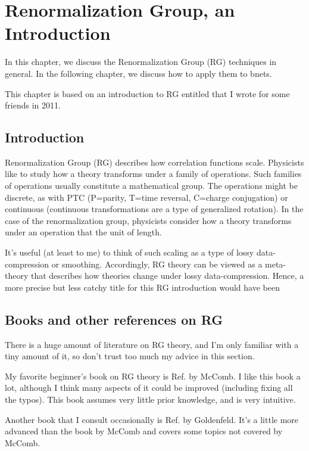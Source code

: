\chapter{Renormalization Group, an Introduction}
\label{ch-renorm-group1}

In this chapter, we discuss
the Renormalization Group (RG)
techniques in general.
In the following chapter,
we discuss how to
apply them to bnets.

This chapter is based on 
an introduction to RG 
entitled  that I wrote for some friends in 2011.

\section{Introduction}
 Renormalization Group (RG)
 describes how
correlation functions
scale.
Physicists
like to study how a
theory transforms under a family of operations.
Such families of operations
usually constitute a mathematical group.
The operations might be discrete, as with
PTC (P=parity, T=time reversal, C=charge conjugation)
or continuous (continuous transformations
are a type of generalized rotation). In
the case of the renormalization
group, physicists consider
how a theory transforms under
an operation that 
 the unit of length.

It's useful (at least to me) to think
of such scaling as a type of
lossy data-compression or
smoothing.
Accordingly,
RG theory can be viewed
as a meta-theory
that describes how theories change under
lossy data-compression. Hence, a
more precise
but less catchy title for this RG introduction
would have been 



\section{Books and other references on RG}
There is a huge amount of
literature on RG theory,
and I'm only familiar with
a tiny amount of it,
so don't trust too much my advice
in this section.


My favorite beginner's book on
RG theory is
Ref.\cite{Mc} by McComb.
I like this book a lot,
although I think many aspects of it
could be improved (including
fixing all the typos). This book assumes
very little prior knowledge,
and is very intuitive.

Another book
that I consult occasionally
is Ref.\cite{Go} by Goldenfeld. It's
 a little more advanced
than the book by McComb
and covers some topics not
covered by McComb.

